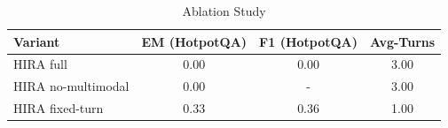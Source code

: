 \begin{table}[t]
\centering
\caption{Ablation Study}
\begin{tabular}{lccc}
\hline
Variant & EM (HotpotQA) & F1 (HotpotQA) & Avg-Turns \\
\hline
HIRA full & 0.00 & 0.00 & 3.00 \\
HIRA no-multimodal & 0.00 & - & 3.00 \\
HIRA fixed-turn & 0.33 & 0.36 & 1.00 \\
\hline
\end{tabular}
\end{table}
